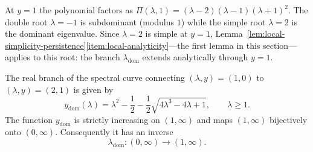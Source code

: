\begin{remark}[Reducible boundary at $y=1$]\label{rem:y1-reducible}
At $y=1$ the polynomial factors as $\Pi(\lambda,1)=(\lambda-2)(\lambda-1)(\lambda+1)^2$.
The double root $\lambda=-1$ is subdominant (modulus $1$) while the simple root $\lambda=2$ is the dominant eigenvalue.
Since $\lambda=2$ is simple at $y=1$, Lemma~\ref{lem:local-simplicity-persistence}\ref{item:local-analyticity}---the first lemma in this section---applies to this root: the branch $\lambda_{\mathrm{dom}}$ extends analytically through $y=1$.
\end{remark}

\begin{theorem}\label{thm:physical-sheet}
The real branch of the spectral curve connecting $(\lambda, y) = (1, 0)$ to $(\lambda, y) = (2, 1)$ is given by
\begin{equation}\label{eq:y-phys}
y_{\mathrm{dom}}(\lambda)
= \lambda^2 - \frac{1}{2} - \frac{1}{2}\sqrt{4\lambda^3 - 4\lambda + 1},
\qquad \lambda \ge 1.
\end{equation}
The function $y_{\mathrm{dom}}$ is strictly increasing on $(1, \infty)$ and maps $(1, \infty)$ bijectively onto $(0, \infty)$.
Consequently it has an inverse
\[
\lambda_{\mathrm{dom}}:(0,\infty)\to(1,\infty).
\]
\end{theorem}

